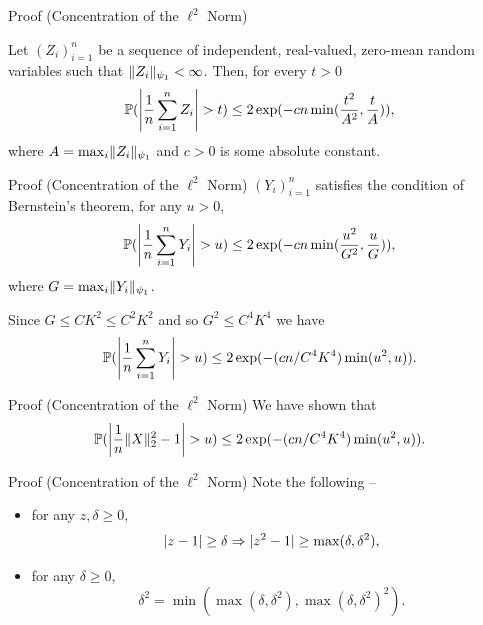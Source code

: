 \documentclass{beamer}
\begin{document}
  \begin{frame}{Proof (Concentration of the \(\ell^{2}\) Norm)}
    \begin{theorem}[Bernstein]
      \label{thm:bernsteins-ineq}
      Let \((Z_{i})_{i=1}^{n}\) be a sequence of independent, real-valued, zero-mean
      random variables such that \(\norm{Z_{i}}_{\psi_{1}} < \infty\). Then, for
      every \(t > 0\)
      \begin{equation}
        \Pr(\abs*{\frac{1}{n}\sum_{i=1}^{n}Z_{i}} > t) \leq 2\exp(-cn\min(\frac{t^{2}}{A^{2}}, \frac{t}{A})),
      \end{equation}
      where \(A = \max_{i}\norm{Z_{i}}_{\psi_{1}}\) and \(c > 0\) is some absolute constant.
    \end{theorem}
  \end{frame}

  \begin{frame}{Proof (Concentration of the \(\ell^{2}\) Norm)}
    \((Y_{i})_{i=1}^{n}\) satisfies the condition of Bernstein's theorem, \pause for any \(u > 0\),
    \begin{equation}
      \Pr(\abs*{\frac{1}{n}\sum_{i=1}^{n}Y_{i}} > u) \leq 2 \exp(-cn\min(\frac{u^{2}}{G^{2}}, \frac{u}{G})),
    \end{equation}
    where \(G = \max_{i}\norm{Y_{i}}_{\psi_{1}}\). \pause

    Since \(G \leq CK^{2} \leq C^{2}K^{2}\) and so \(G^{2} \leq C^{4}K^{4}\) we have
    \begin{equation}
      \label{eq:2}
      \Pr(\abs*{\frac{1}{n}\sum_{i=1}^{n}Y_{i}} > u) \leq 2 \exp(-(cn / C^{4}K^{4})\min(u^{2}, u)).
    \end{equation}
  \end{frame}

  \begin{frame}{Proof (Concentration of the \(\ell^{2}\) Norm)}
    We have shown that
    \begin{equation}
      \Pr(\abs*{\frac{1}{n}\norm{X}_{2}^{2} - 1} > u) \leq 2 \exp(-(cn / C^{4}K^{4})\min(u^{2}, u)).
    \end{equation}
  \end{frame}

  \begin{frame}{Proof (Concentration of the \(\ell^{2}\) Norm)}
    Note the following -- \pause
    \begin{itemize}
      \item for any \(z, \delta \geq 0\),
      \begin{equation}
        \label{eq:zp1-delta-observation}
        \abs{z - 1} \geq \delta \Rightarrow \abs{z^{2} - 1} \geq \max(\delta, \delta^{2}),
      \end{equation}
      \pause
      \item for any \(\delta \geq 0\),
      \begin{equation}
        \delta^{2} = \min(\max(\delta, \delta^{2}), \max(\delta, \delta^{2})^{2}).
      \end{equation}
    \end{itemize}
  \end{frame}
\end{document}
